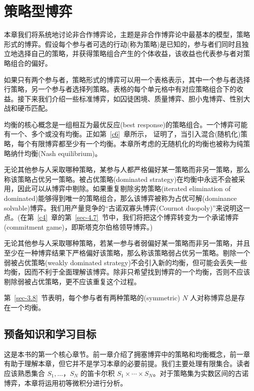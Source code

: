 \chapter{策略型博弈}  \label{c3}

本章我们将系统地讨论非合作博弈论，主题是非合作博弈论中最基本的模型，策略形式的博弈。假设每个参与者可选的行动(称为策略)是已知的，参与者们同时且独立地选择自己的策略，并获得策略组合产生的个体收益，该收益也代表参与者对策略组合的偏好。

如果只有两个参与者，策略形式的博弈可以用一个表格表示，其中一个参与者选择行策略，另一个参与者选择列策略。表格的每个单元格中有对应策略组合下的收益。接下来我们介绍一些标准博弈，如囚徒困境、质量博弈、胆小鬼博弈、性别大战和硬币匹配。

均衡的核心概念是一组相互为最优反应(best response)的策略组合。一个博弈可能有一个、多个或没有均衡。正如第~\ref{c6}~章所示，\citet{nash1951} 证明了，当引入混合(随机化)策略，每个有限博弈都至少有一个均衡。本章所考虑的无随机化的均衡也被称为纯策略纳什均衡(Nash equilibrium)。

无论其他参与人采取哪种策略，某参与人都严格偏好某一策略而非另一策略，那么称该策略占优另一策略。被占优策略(dominated strategy)在均衡中永远不会被采用，因此可以从博弈中剔除。如果重复剔除劣势策略(iterated elimination of dominated)能够得到唯一的策略组合，那么该博弈被称为占优可解(dominance solvable)博弈。我们用产量竞争的“古诺双寡头博弈(Cournot duopoly)”来说明这一点。(在第~\ref{c4}~章的第~\ref{sec-4.7}~节中，我们将把这个博弈转变为一个承诺博弈(commitment game)，即斯塔克尔伯格领导博弈。)

无论其他参与人采取哪种策略，若某一参与者弱偏好某一策略而非另一策略，并且至少在一种博弈结果下严格偏好该策略，那么称该策略弱占优另一策略。剔除一个弱被占优策略(weakly dominated strategy)不会引入新的均衡，但可能会丢失一些均衡，因而不利于全面理解该博弈。除非只希望找到博弈的一个均衡，否则不应该剔除弱被占优策略，更不应该重复这个过程。

第~\ref{sec-3.8}~节表明，每个参与者有两种策略的(symmetric) \(N\) 人对称博弈总是存在一个均衡。

\section{预备知识和学习目标}

这是本书的第一个核心章节。前一章介绍了拥塞博弈中的策略和均衡概念，前一章有助于理解本章，但它并不是学习本章的必要前提。我们主要处理有限集合。读者应该熟悉集合 \({S}_{1},\ldots，{S}_{N}\) 的笛卡尔积 \({S}_{1} \times  \cdots  \times  {S}_{N}\)。对于策略集为实数区间的古诺博弈，本章将运用初等微积分进行分析。

